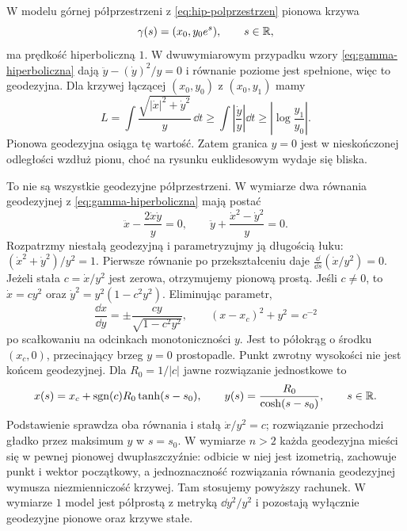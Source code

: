 \begin{przyklad}
\label{prz:geodezyjne-hiperboliczne}
W modelu górnej półprzestrzeni z
\eqref{eq:hip-polprzestrzen} pionowa krzywa
\[
 \gamma(s)=(x_0,y_0e^s),\qquad s\in\mathbb{R},
\]
ma prędkość hiperboliczną $1$.
W dwuwymiarowym przypadku wzory
\eqref{eq:gamma-hiperboliczna} dają
$\ddot y-(\dot y)^2/y=0$ i równanie
poziome jest spełnione, więc to geodezyjna.
Dla krzywej łączącej $(x_0,y_0)$ z
$(x_0,y_1)$ mamy
\[
 L=\int\frac{\sqrt{|\dot x|^2+\dot y^2}}{y}\,\dd t
 \geq\int\left|\frac{\dot y}{y}\right|\dd t
 \geq\left|\log\frac{y_1}{y_0}\right|.
\]
Pionowa geodezyjna osiąga tę wartość.
Zatem granica $y=0$ jest w nieskończonej
odległości wzdłuż pionu, choć na rysunku
euklidesowym wydaje się bliska.

To nie są wszystkie geodezyjne półprzestrzeni.
W wymiarze dwa równania geodezyjnej z
\eqref{eq:gamma-hiperboliczna} mają postać
\[
 \ddot x-\frac{2\dot x\dot y}{y}=0,
 \qquad
 \ddot y+\frac{\dot x^2-\dot y^2}{y}=0.
\]
Rozpatrzmy niestałą geodezyjną i parametryzujmy ją długością łuku:
$(\dot x^2+\dot y^2)/y^2=1$. Pierwsze równanie
po przekształceniu daje
$\frac{\dd}{\dd s}(\dot x/y^2)=0$.
Jeżeli stała $c=\dot x/y^2$ jest zerowa,
otrzymujemy pionową prostą. Jeśli $c\ne0$,
to $\dot x=cy^2$ oraz
$\dot y^2=y^2(1-c^2y^2)$. Eliminując parametr,
\[
 \frac{\dd x}{\dd y}
   =\pm\frac{cy}{\sqrt{1-c^2y^2}},
 \qquad
 (x-x_c)^2+y^2=c^{-2}
\]
po scałkowaniu na odcinkach monotoniczności $y$.
Jest to półokrąg o środku $(x_c,0)$,
przecinający brzeg $y=0$ prostopadle.
Punkt zwrotny wysokości nie jest końcem geodezyjnej.
Dla $R_0=1/|c|$ jawne rozwiązanie jednostkowe to
\[
 x(s)=x_c+\operatorname{sgn}(c)R_0\tanh(s-s_0),\qquad
 y(s)=\frac{R_0}{\cosh(s-s_0)},\qquad s\in\mathbb{R}.
\]
Podstawienie sprawdza oba równania i stałą $\dot x/y^2=c$;
rozwiązanie przechodzi gładko przez maksimum $y$ w $s=s_0$.
W wymiarze $n>2$ każda geodezyjna mieści się
w pewnej pionowej dwupłaszczyźnie: odbicie
w niej jest izometrią, zachowuje punkt i wektor
początkowy, a jednoznaczność rozwiązania
równania geodezyjnej wymusza niezmienniczość
krzywej. Tam stosujemy powyższy rachunek. W wymiarze $1$
model jest półprostą z metryką $\dd y^2/y^2$ i pozostają
wyłącznie geodezyjne pionowe oraz krzywe stałe.


\end{przyklad}
